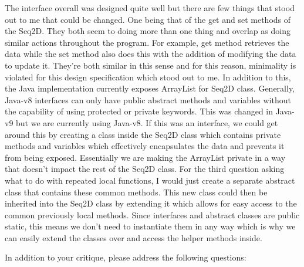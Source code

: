 \documentclass[12pt]{article}
\begin{document}
The interface overall was designed quite well but there are few things that stood out to me that could be changed. One being that of the get and set methods of the Seq2D. They both seem to doing more than one thing and overlap as doing similar actions throughout the program. For example, get method retrieves the data while the set method also does this with the addition of modifying the data to update it. They're both similar in this sense and for this reason, minimality is violated for this design specification which stood out to me. In addition to this, the Java implementation currently exposes ArrayList for Seq2D class. Generally, Java-v8 interfaces can only have public abstract methods and variables without the capability of using protected or private keywords. This was changed in Java-v9 but we are currently using Java-v8. If this was an interface, we could get around this by creating a class inside the Seq2D class which contains private methods and variables which effectively encapsulates the data and prevents it from being exposed. Essentially we are making the ArrayList private in a way that doesn't impact the rest of the Seq2D class. For the third question asking what to do with repeated local functions, I would just create a separate abstract class that contains these common methods. This new class could then be inherited into the Seq2D class by extending it which allows for easy access to the common previously local methods. Since interfaces and abstract classes are public static, this means we don't need to instantiate them in any way which is why we can easily extend the classes over and access the helper methods inside.

In addition to your critique, please address the following questions:
\end{document}
